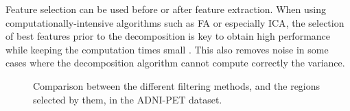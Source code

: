 Feature selection can be used before or after feature extraction. When using computationally-intensive algorithms such as \ac{FA} or especially \ac{ICA}, the selection of best features prior to the decomposition is key to obtain high performance while keeping the computation times small \cite{Martinez201141,Martinez-Murcia20129676}. This also removes noise in some cases where the decomposition algorithm cannot compute correctly the variance. 

\begin{figure}[bth]
	\myfloatalign
	\quad
	\quad
	\caption[Comparison between the different filtering methods.]{Comparison between the different filtering methods, and the regions selected by them, in the ADNI-PET dataset. }\label{fig:comparisonSelection}
\end{figure}


